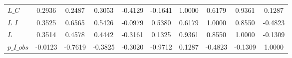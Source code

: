 \begin{center}
\begin{longtable}{lccccccccc}
$L\_C            $	 & 	            0.2936	 & 	            0.2487	 & 	            0.3053	 & 	           -0.4129	 & 	           -0.1641	 & 	            1.0000	 & 	            0.6179	 & 	            0.9361	 & 	            0.1287 \\ 
$L\_I            $	 & 	            0.3525	 & 	            0.6565	 & 	            0.5426	 & 	           -0.0979	 & 	            0.5380	 & 	            0.6179	 & 	            1.0000	 & 	            0.8550	 & 	           -0.4823 \\ 
$L               $	 & 	            0.3514	 & 	            0.4578	 & 	            0.4442	 & 	           -0.3161	 & 	            0.1325	 & 	            0.9361	 & 	            0.8550	 & 	            1.0000	 & 	           -0.1309 \\ 
$p\_I\_obs       $	 & 	           -0.0123	 & 	           -0.7619	 & 	           -0.3825	 & 	           -0.3020	 & 	           -0.9712	 & 	            0.1287	 & 	           -0.4823	 & 	           -0.1309	 & 	            1.0000 \\ 
\end{longtable}
 \end{center}
